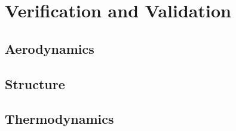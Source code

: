 \section{Verification and Validation}

\subsection{Aerodynamics} \label{sec:VandVaero}


\subsection{Structure} \label{sec:VandVstruc}




\subsection{Thermodynamics} \label{sec:VandVthermo}

